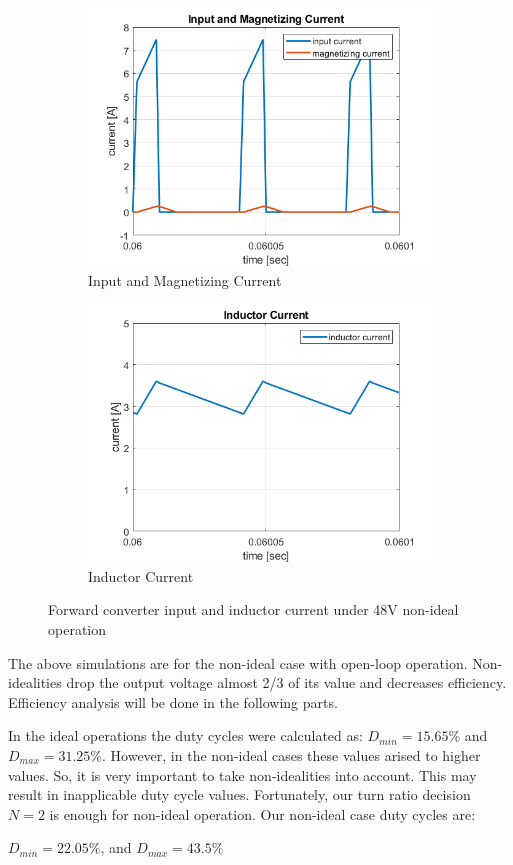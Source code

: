 \begin{figure}[H]
\centering
\begin{subfigure}{7 cm}
  \centering
  \includegraphics[width=7 cm]{Figs/input_current_non48.png}
  \caption{Input and Magnetizing Current}
  \label{fig:input_current_48_com}
\end{subfigure}%
\begin{subfigure}{7 cm}
  \centering
  \includegraphics[width=7 cm]{Figs/inductor_current_non48.png}
  \caption{Inductor Current}
  \label{fig:inductor_current_48_com}
\end{subfigure}
\caption{Forward converter input and inductor current under 48V non-ideal operation}
\label{fig:current_24}
\end{figure}

The above simulations are for the non-ideal case with open-loop operation. Non-idealities drop the output voltage almost 2/3 of its value and decreases efficiency. Efficiency analysis will be done in the following parts.

In the ideal operations the duty cycles were calculated as: $D_{min} = 15.65\%$ and $D_{max} = 31.25\%$. However, in the non-ideal cases these values arised to higher values. So, it is very important to take non-idealities into account. This may result in inapplicable duty cycle values. Fortunately, our turn ratio decision $N=2$ is enough for non-ideal operation. Our non-ideal case duty cycles are:

$D_{min} = 22.05\%$, and $D_{max} = 43.5\%$

